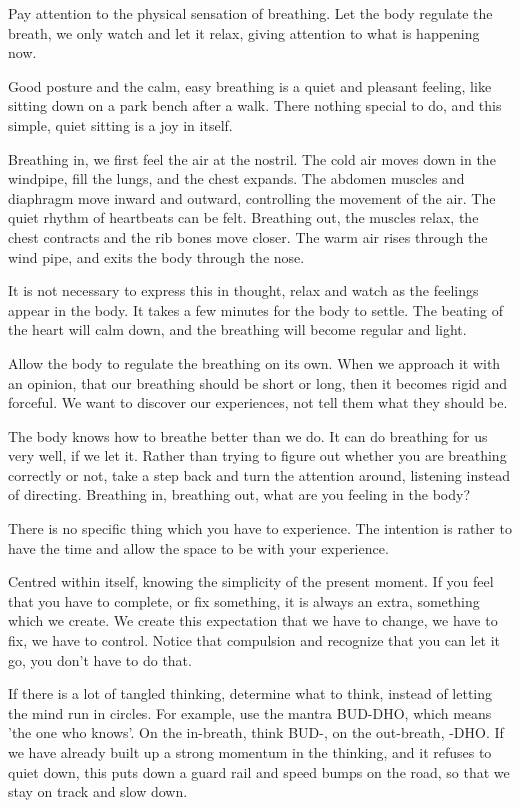 Pay attention to the physical sensation of breathing. Let the body
regulate the breath, we only watch and let it relax, giving attention to
what is happening now.

Good posture and the calm, easy breathing is a quiet and pleasant
feeling, like sitting down on a park bench after a walk. There nothing
special to do, and this simple, quiet sitting is a joy in itself.

Breathing in, we first feel the air at the nostril. The cold air moves
down in the windpipe, fill the lungs, and the chest expands. The abdomen
muscles and diaphragm move inward and outward, controlling the movement
of the air. The quiet rhythm of heartbeats can be felt. Breathing out,
the muscles relax, the chest contracts and the rib bones move closer.
The warm air rises through the wind pipe, and exits the body through the
nose.

It is not necessary to express this in thought, relax and watch as the
feelings appear in the body. It takes a few minutes for the body to
settle. The beating of the heart will calm down, and the breathing will
become regular and light.

Allow the body to regulate the breathing on its own. When we approach it
with an opinion, that our breathing should be short or long, then it
becomes rigid and forceful. We want to discover our experiences, not
tell them what they should be.

The body knows how to breathe better than we do. It can do breathing for
us very well, if we let it. Rather than trying to figure out whether you
are breathing correctly or not, take a step back and turn the attention
around, listening instead of directing. Breathing in, breathing out,
what are you feeling in the body?

There is no specific thing which you have to experience. The intention
is rather to have the time and allow the space to be with your
experience.

Centred within itself, knowing the simplicity of the present moment. If
you feel that you have to complete, or fix something, it is always an
extra, something which we create. We create this expectation that we
have to change, we have to fix, we have to control. Notice that
compulsion and recognize that you can let it go, you don't have to do
that.

If there is a lot of tangled thinking, determine what to think, instead
of letting the mind run in circles. For example, use the mantra BUD-DHO,
which means 'the one who knows'. On the in-breath, think BUD-, on the
out-breath, -DHO. If we have already built up a strong momentum in the
thinking, and it refuses to quiet down, this puts down a guard rail and
speed bumps on the road, so that we stay on track and slow down.

